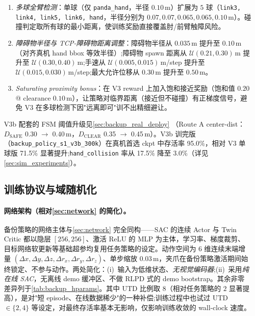 \begin{enumerate}
  \item \emph{多球全臂检测}：单球（仅 \texttt{panda\_hand}，半径 $0.10$\,m）扩展为 $5$ 球（\texttt{link3, link4, link5, link6, hand}，半径分别为 $0.07, 0.07, 0.065, 0.065, 0.10$\,m）。碰撞判定取所有球的最小距离，使训练奖励直接覆盖肘/前臂触障风险。
  \item \emph{障碍物半径与 TCP-障碍物距离调整}：障碍物半径从 $0.035$\,m 提升至 $0.10$\,m（对齐真机 hand bbox 等效半径）;障碍物 spawn 距离从 $\mathcal{U}(0.21, 0.30)$\,m 提升至 $\mathcal{U}(0.30, 0.40)$\,m;手速从 $\mathcal{U}(0.005, 0.015)$\,m/step 提升至 $\mathcal{U}(0.015, 0.030)$\,m/step;最大允许位移从 $0.30$\,m 提升至 $0.50$\,m。
  \item \emph{Saturating proximity bonus}：在 V3 reward 上加入饱和接近奖励（饱和值 $0.20$ @ clearance $0.10$\,m），让策略对临界距离（接近但不碰撞）有正梯度信号，避免 V3 在多球检测下因"远离即可"训不出精细避让。
\end{enumerate}

V3b 配套的 FSM 阈值升级见\cref{sec:backup_real_deploy} （Route A center-dist：$D_\text{SAFE}$ 0.30 $\to$ 0.40\,m，$D_\text{CLEAR}$ 0.35 $\to$ 0.45\,m）。V3b 训完版（\texttt{backup\_policy\_s1\_v3b\_300k}）在真机首选 ckpt 中存活率 95.0\%，相对 V3 单球版 71.5\% 显著提升;\texttt{hand\_collision} 率从 17.5\% 降至 3.0\%（详见\cref{sec:sim_experiments}）。

\subsection{训练协议与域随机化}\label{sec:backup_training}

\paragraph{网络架构（相对\cref{sec:network} 的简化）。}备份策略的网络主体与\cref{sec:network} 完全同构——SAC 的连续 Actor 与 Twin Critic 都以隐层 $[256, 256]$、激活 ReLU 的 MLP 为主体，学习率、梯度裁剪、目标网络软更新等基础超参均复用任务策略的设定。动作空间为 $6$ 维连续末端增量 $(\Delta x, \Delta y, \Delta z, \Delta r_x, \Delta r_y, \Delta r_z)$、单步缩放 $0.03$\,m，夹爪在备份策略激活期间始终锁定、不参与动作。两处简化：(i)~输入为低维状态、\emph{无视觉编码器};(ii)~采用\emph{纯在线 SAC}，无离线 demo 缓冲区、不做 RLPD 式的 demo bootstrap。其余非零差异列于\cref{tab:backup_hparams}。其中 UTD 比例取 $8$（相对任务策略的 $2$ 显著提高），是对"短 episode、在线数据稀少"的一种补偿;训练过程中也试过 UTD $\in \{2, 4\}$ 等设定，对最终存活率基本无影响，仅影响训练收敛的 wall-clock 速度。

